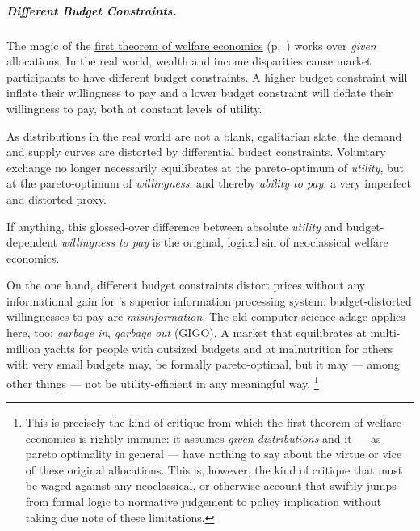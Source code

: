 

\subparagraph{Different Budget Constraints.}
	\label{sec:different-budget-constraints}
The magic of the \hyperref[fn:1st-theorem]{first theorem of welfare economics} (p.~\pageref{fn:1st-theorem}) works over \emph{given} allocations.
In the real world, wealth and income disparities cause market participants to have different budget constraints.
A higher budget constraint will inflate their willingness to pay and a lower budget constraint will deflate their willingness to pay, both at constant levels of utility.

As distributions in the real world are not a blank, egalitarian slate, the demand and supply curves are distorted by differential budget constraints.
Voluntary exchange no longer necessarily equilibrates at the pareto-optimum of \emph{utility}, but at the pareto-optimum of \emph{willingness}, and thereby \emph{ability to pay}, a very imperfect and distorted proxy.

If anything, this glossed-over difference between absolute \emph{utility} and budget-dependent \emph{willingness to pay} is the original, logical sin of neoclassical welfare economics.

On the one hand, different budget constraints distort prices without any informational gain for \citeauthor{Hayek1931}'s superior information processing system:
budget-distorted willingnesses to pay are \emph{misinformation}.
The old computer science adage applies here, too:
\emph{garbage in}, \emph{garbage out} (GIGO).
A market that equilibrates at multi-million yachts for people with outsized budgets and at malnutrition for others with very small budgets may, be formally pareto-optimal, but it may --- among other things --- not be utility-efficient in any meaningful way.
\footnote{
	This is precisely the kind of critique from which the first theorem of welfare economics is rightly immune:
	it assumes \emph{given distributions} and it --- as pareto optimality in general --- have nothing to say about the virtue or vice of these original allocations.
	This is, however, the kind of critique that must be waged against any neoclassical, or otherwise account that swiftly jumps from formal logic to normative judgement to policy implication without taking due note of these limitations.
}

